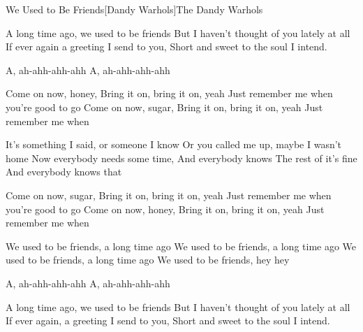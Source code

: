 \documentclass[a4paper,11pt,french]{article}
\begin{document}

\begin{Song}{We Used to Be Friends}[Dandy Warhols]{The Dandy Warhols}
\begin{multicols}{2}

\begin{Verse}
A long time ago, we used to be friends
But I haven't thought of you lately at all
If ever again a greeting I send to you,
Short and sweet to the soul I intend.
\espaceInterStrophe

A, ah-ahh-ahh-ahh
A, ah-ahh-ahh-ahh
\bis
\end{Verse}
\espaceInterStrophe

\begin{PreChorus}
Come on now, honey,
Bring it on, bring it on, yeah
Just remember me when you're good to go
Come on now, sugar,
Bring it on, bring it on, yeah
Just remember me when
\end{PreChorus}
\espaceInterStrophe

\begin{Verse}
It's something I said, or someone I know
Or you called me up, maybe I wasn't home
Now everybody needs some time,
And everybody knows
The rest of it's fine
And everybody knows that
\end{Verse}
\vfill
\columnbreak

\begin{PreChorus}
Come on now, sugar,
Bring it on, bring it on, yeah
Just remember me when you're good to go
Come on now, honey,
Bring it on, bring it on, yeah
Just remember me when
\end{PreChorus}
\espaceInterStrophe

\begin{Chorus}
We used to be friends, a long time ago
We used to be friends, a long time ago
We used to be friends, a long time ago
We used to be friends, hey hey
\end{Chorus}
\espaceInterStrophe

\begin{Verse}
A, ah-ahh-ahh-ahh
A, ah-ahh-ahh-ahh
\bis
\end{Verse}
\espaceInterStrophe

\begin{Verse}
A long time ago, we used to be friends
But I haven't thought of you lately at all
If ever again, a greeting I send to you,
Short and sweet to the soul I intend.
\end{Verse}
\espaceInterStrophe


\end{multicols}
\end{Song}
\end{document}
